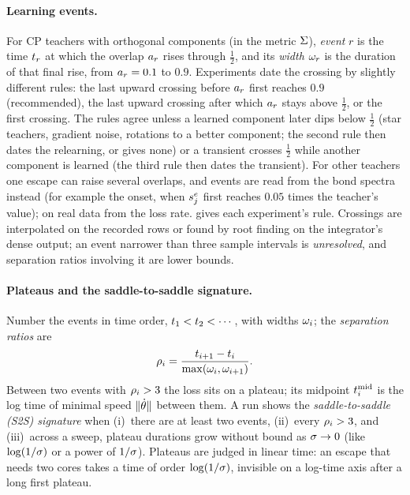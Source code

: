 \paragraph{Learning events.}
For CP teachers with orthogonal components (in the metric $\Sigma$), \emph{event} $r$ is the time
$t_{r}$ at which the overlap $a_{r}$ rises through $\frac12$, and its \emph{width} $\omega_{r}$ is the
duration of that final rise, from $a_{r}=0.1$ to $0.9$. Experiments date the crossing by slightly
different rules: the last upward crossing before $a_{r}$ first reaches $0.9$ (recommended), the last
upward crossing after which $a_{r}$ stays above $\frac12$, or the first crossing. The rules agree
unless a learned component later dips below $\frac12$ (star teachers, gradient noise, rotations to a
better component; the second rule then dates the relearning, or gives none) or a transient crosses $\frac12$ while
another component is learned (the third rule then dates the transient). For other teachers one escape
can raise several overlaps, and events are read from the bond spectra instead (for example the onset,
when $s^{e}_{j}$ first reaches $0.05$ times the teacher's value); on real data from the loss rate.
 gives each experiment's rule. Crossings are interpolated on the recorded rows or
found by root finding on the integrator's dense output; an event narrower than three sample intervals
is \emph{unresolved}, and separation ratios involving it are lower bounds.

\paragraph{Plateaus and the saddle-to-saddle signature.}
Number the events in time order, $t_{1}<t_{2}<\cdots$, with widths $\omega_{i}$; the
\emph{separation ratios} are
\begin{equation}\label{eq:separation}
  \rho_{i}=\frac{t_{i+1}-t_{i}}{\max(\omega_{i},\omega_{i+1})}.
\end{equation}
Between two events with $\rho_{i}>3$ the loss sits on a plateau; its midpoint $t^{\mathrm{mid}}_{i}$ is the log
time of minimal speed $\lVert\dot{\theta}\rVert$ between them. A run shows the \emph{saddle-to-saddle (S2S)
signature} when (i)~there are at least two events, (ii)~every $\rho_{i}>3$, and (iii)~across a sweep,
plateau durations grow without bound as $\sigma\to0$ (like $\log(1/\sigma)$ or a power of $1/\sigma$).
Plateaus are judged in linear time: an escape that needs two cores takes a time of order
$\log(1/\sigma)$, invisible on a log-time axis after a long first plateau.

